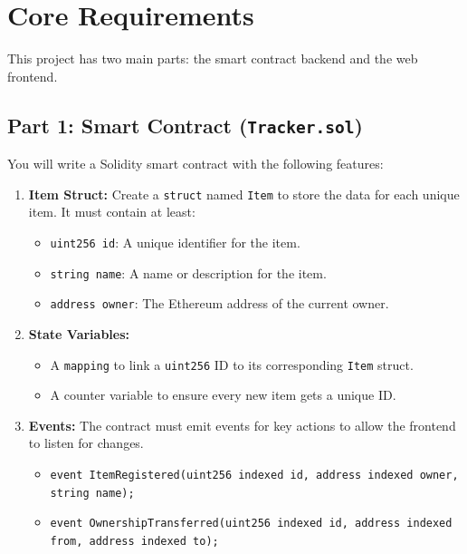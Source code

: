\documentclass[12pt]{extarticle}
\begin{document}
\section*{Core Requirements}
This project has two main parts: the smart contract backend and the web frontend.

\subsection*{Part 1: Smart Contract (\texttt{Tracker.sol})}
You will write a Solidity smart contract with the following features:

\begin{enumerate}
    \item \textbf{Item Struct:} Create a \texttt{struct} named \texttt{Item} to store the data for each unique item. It must contain at least:
          \begin{itemize}
              \item \texttt{uint256 id}: A unique identifier for the item.
              \item \texttt{string name}: A name or description for the item.
              \item \texttt{address owner}: The Ethereum address of the current owner.
          \end{itemize}

    \item \textbf{State Variables:}
          \begin{itemize}
              \item A \texttt{mapping} to link a \texttt{uint256} ID to its corresponding \texttt{Item} struct.
              \item A counter variable to ensure every new item gets a unique ID.
          \end{itemize}

    \item \textbf{Events:} The contract must emit events for key actions to allow the frontend to listen for changes.
          \begin{itemize}
              \item \texttt{event ItemRegistered(uint256 indexed id, address indexed owner, string name);}
              \item \texttt{event OwnershipTransferred(uint256 indexed id, address indexed from, address indexed to);}
          \end{itemize}


\end{enumerate}
\end{document}
